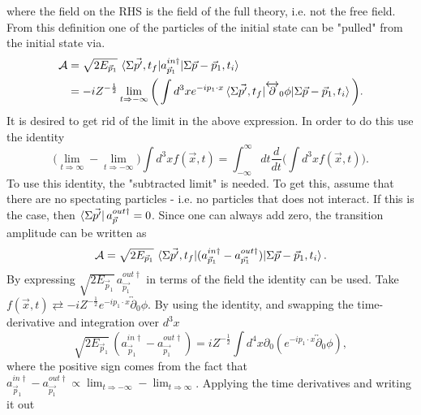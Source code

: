 where the field on the RHS is the field of the full theory, i.e. not the free field. From this definition one of the particles of the initial state can be "pulled" from the initial state via.
\begin{equation}
	\begin{split}
		\mathcal{A}&=\sqrt{2E_{\vec{p}_1}}\,\braket{\Sigma\vec{p'},t_f|a_{\vec{p}_1}^{in \dagger}|\Sigma\vec{p}-\vec{p}_1,t_i}\\
		&=-iZ^{-\frac{1}{2}}\lim_{t\Rightarrow -\infty}\bigg(\int d^3x e^{-ip_1\cdot x}\braket{\Sigma\vec{p'},t_f|\overleftrightarrow{\partial}_0\phi|\Sigma\vec{p}-\vec{p}_1,t_i}\bigg).\\
	\end{split}
\end{equation} 
It is desired to get rid of the limit in the above expression. In order to do this use the identity
\begin{equation}
	\bigg( \lim_{t\Rightarrow \infty} -\lim_{t\Rightarrow -\infty} \bigg)\int d^3x f(\vec{x},t)=\int_{-\infty}^{\infty}dt \frac{d}{dt}\bigg(\int d^3x f(\vec{x},t)\bigg).
\end{equation} 
To use this identity, the "subtracted limit" is needed. To get this, assume that there are no spectating particles - i.e. no particles that does not interact. If this is the case, then $\bra{\Sigma \vec{p'}}a_{\vec{p}}^{out\dagger}=0$. Since one can always add zero, the transition amplitude can be written as
\begin{equation}
	\mathcal{A}=\sqrt{2E_{\vec{p}_1}}\,\braket{\Sigma\vec{p'},t_f|(a_{\vec{p}_1}^{in \dagger}-a_{\vec{p_1}}^{out\dagger})|\Sigma\vec{p}-\vec{p}_1,t_i}.\\
\end{equation} 
By expressing $\sqrt{2E_{\vec{p}_1}}\,a_{\vec{p_1}}^{out\dagger}$ in terms of the field the identity can be used. Take $f(\vec{x},t)\rightleftarrows -iZ^{-\frac{1}{2}}e^{-ip_1\cdot x}\overleftrightarrow{\partial}_0\phi$. By using the identity, and swapping the time-derivative and integration over $d^3x$
\begin{equation}
	\sqrt{2E_{\vec{p}_1}}\,(a_{\vec{p}_1}^{in \dagger}-a_{\vec{p_1}}^{out\dagger})=iZ^{-\frac{1}{2}}\int d^4x \partial_0(e^{-ip_1\cdot x}\overleftrightarrow{\partial}_0\phi),
\end{equation} 
where the positive sign comes from the fact that $a_{\vec{p}_1}^{in \dagger}-a_{\vec{p_1}}^{out\dagger}\propto\lim_{t\Rightarrow -\infty} -\lim_{t\Rightarrow \infty}$. Applying the time derivatives and writing it out
